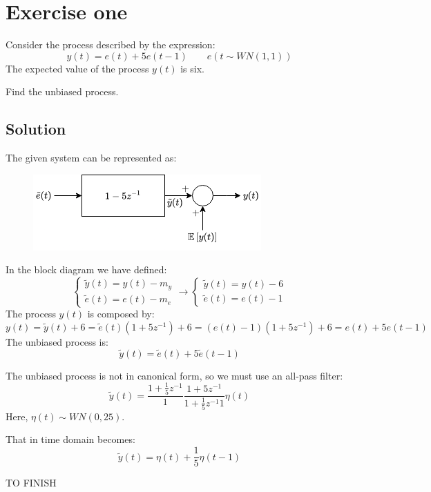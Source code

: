 \section{Exercise one}

Consider the process described by the expression: 
\[y(t)=e(t)+5e(t-1)\qquad e(t\sim WN(1,1))\]
The expected value of the process $y(t)$ is six. 

Find the unbiased process. 

\subsection*{Solution}
The given system can be represented as: 
\begin{figure}[H]
    \centering
    \includegraphics[width=0.5\linewidth]{images/bias.png}
\end{figure}
In the block diagram we have defined: 
\[\begin{cases}
    \tilde{y}(t)=y(t)-m_y \\
    \tilde{e}(t)=e(t)-m_e 
\end{cases}\rightarrow \begin{cases}
    \tilde{y}(t)=y(t)-6 \\
    \tilde{e}(t)=e(t)-1 
\end{cases}\]
The process $y(t)$ is composed by: 
\[y(t)=\tilde{y}(t)+6=\tilde{e}(t)\left( 1+5z^{-1} \right)+6=\left(e(t)-1\right)\left( 1+5z^{-1} \right)+6=e(t)+5e(t-1)\]
The unbiased process is: 
\[\tilde{y}(t)=\tilde{e}(t)+5\tilde{e}(t-1)\]

The unbiased process is not in canonical form, so we must use an all-pass filter: 
\[\tilde{y}(t)=\dfrac{1+\frac{1}{5}z^{-1}}{1}\dfrac{1+5z^{-1}}{1+\frac{1}{5}z^{-1}1}\eta(t)\]
Here, $\eta(t)\sim WN(0,25)$. 

That in time domain becomes: 
\[\tilde{y}(t)=\eta(t)+\dfrac{1}{5}\eta(t-1)\]


TO FINISH






